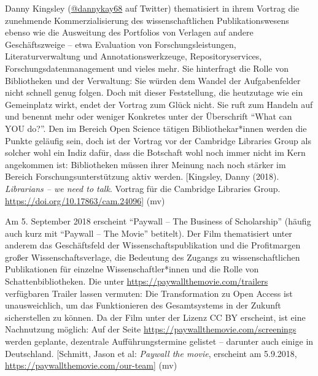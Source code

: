 \documentclass[a4paper,
fontsize=11pt,
oneside,
numbers=noperiodatend,
parskip=half-,
bibliography=totoc,
final
]{scrartcl}
\begin{document}
Danny Kingsley (\href{https://twitter.com/dannykay68}{@dannykay68} auf
Twitter) thematisiert in ihrem Vortrag die zunehmende Kommerzialisierung
des wissenschaftlichen Publikationswesens ebenso wie die Ausweitung des
Portfolios von Verlagen auf andere Geschäftszweige -- etwa Evaluation
von Forschungsleistungen, Literaturverwaltung und Annotationswerkzeuge,
Repositoryservices, Forschungsdatenmanagement und vieles mehr. Sie
hinterfragt die Rolle von Bibliotheken und der Verwaltung: Sie würden
dem Wandel der Aufgabenfelder nicht schnell genug folgen. Doch mit
dieser Feststellung, die heutzutage wie ein Gemeinplatz wirkt, endet der
Vortrag zum Glück nicht. Sie ruft zum Handeln auf und benennt mehr oder
weniger Konkretes unter der Überschrift \enquote{What can YOU do?}. Den
im Bereich Open Science tätigen Bibliothekar*in\-nen werden die Punkte
geläufig sein, doch ist der Vortrag vor der Cambridge Libraries Group
als solcher wohl ein Indiz dafür, dass die Botschaft wohl noch immer
nicht im Kern angekommen ist: Bibliotheken müssen ihrer Meinung nach
noch stärker im Bereich Forschungsunterstützung aktiv werden.
{[}Kingsley, Danny (2018). \emph{Librarians -- we need to talk}. Vortrag
für die Cambridge Libraries Group.
\url{https://doi.org/10.17863/cam.24096}{]} (mv)

Am 5. September 2018 erscheint \enquote{Paywall -- The Business of
Scholarship} (häufig auch kurz mit \enquote{Paywall -- The Movie}
betitelt). Der Film thematisiert unter anderem das Geschäftsfeld der
Wissenschaftspublikation und die Profitmargen großer
Wissenschaftsverlage, die Bedeutung des Zugangs zu wissenschaftlichen
Publikationen für einzelne Wissenschaftler*innen und die Rolle von
Schattenbibliotheken. Die unter
\url{https://paywallthemovie.com/trailers} verfügbaren Trailer lassen
vermuten: Die Transformation zu Open Access ist unausweichlich, um das
Funktionieren des Gesamtsystems in der Zukunft sicherstellen zu können.
Da der Film unter der Lizenz CC BY erscheint, ist eine Nachnutzung
möglich: Auf der Seite \url{https://paywallthemovie.com/screenings}
werden geplante, dezentrale Aufführungstermine gelistet -- darunter auch
einige in Deutschland. {[}Schmitt, Jason et al: \emph{Paywall the
movie}, erscheint am 5.9.2018,
\url{https://paywallthemovie.com/our-team}{]} (mv)
\end{document}
